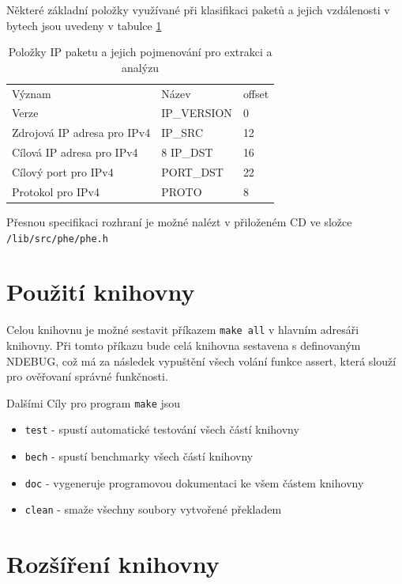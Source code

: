 Některé základní položky využívané při klasifikaci paketů a jejich vzdálenosti v bytech
jsou uvedeny v tabulce \ref{tab:phe}

\begin{table}[!htbp]
	\center
    \begin{tabular}{|l|l|l|}
    \hline
    Význam & Název & offset \\ \hhline{|=|=|=|}
    Verze & IP\_VERSION & 0 \\ \hline
    Zdrojová IP adresa pro IPv4 & IP\_SRC & 12 \\ \hline
    Cílová IP adresa pro IPv4 & 8 IP\_DST & 16 \\ \hline
    Cílový port pro IPv4 & PORT\_DST & 22 \\ \hline
    Protokol pro IPv4 & PROTO & 8 \\ \hline
    \end{tabular}
	\caption{Položky IP paketu a jejich pojmenování pro extrakci a analýzu}
    \label{tab:phe}
\end{table}

Přesnou specifikaci rozhraní je možné nalézt v přiloženém CD ve složce \texttt{/lib/src/phe/phe.h}


\section{Použití knihovny} %
Celou knihovnu je možné sestavit příkazem \texttt{make all} v hlavním adresáři knihovny.
Při tomto příkazu bude celá knihovna sestavena s definovaným NDEBUG, což má za následek vypuštění všech
volání funkce assert, která slouží pro ověřovaní správné funkčnosti.

Dalšími Cíly pro program \texttt{make} jsou

\begin{itemize}
	\item{\texttt{test} - spustí automatické testování všech částí knihovny}
	\item{\texttt{bech} - spustí benchmarky všech částí knihovny}
	\item{\texttt{doc} - vygeneruje programovou dokumentaci ke všem částem knihovny}
	\item{\texttt{clean} - smaže všechny soubory vytvořené překladem}
\end{itemize}

\section{Rozšíření knihovny} %

